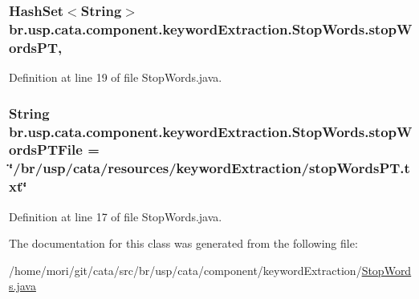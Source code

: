 \hypertarget{classbr_1_1usp_1_1cata_1_1component_1_1keyword_extraction_1_1_stop_words_af7f20647ee5e5a87e9a853aeb3fd082c}{
\subsubsection[{stop\+Words\+P\+T}]{\setlength{\rightskip}{0pt plus 5cm}Hash\+Set$<$String$>$ br.\+usp.\+cata.\+component.\+keyword\+Extraction.\+Stop\+Words.\+stop\+Words\+P\+T\hspace{0.3cm}{\ttfamily [static]}, {\ttfamily [private]}}}\label{classbr_1_1usp_1_1cata_1_1component_1_1keyword_extraction_1_1_stop_words_af7f20647ee5e5a87e9a853aeb3fd082c}


Definition at line 19 of file Stop\+Words.\+java.

\hypertarget{classbr_1_1usp_1_1cata_1_1component_1_1keyword_extraction_1_1_stop_words_a510f6cbec0ff0da13defd502448ffc21}{
\subsubsection[{stop\+Words\+P\+T\+File}]{\setlength{\rightskip}{0pt plus 5cm}String br.\+usp.\+cata.\+component.\+keyword\+Extraction.\+Stop\+Words.\+stop\+Words\+P\+T\+File = \char`\"{}/br/usp/cata/resources/keyword\+Extraction/stop\+Words\+P\+T.\+txt\char`\"{}\hspace{0.3cm}{\ttfamily [private]}}}\label{classbr_1_1usp_1_1cata_1_1component_1_1keyword_extraction_1_1_stop_words_a510f6cbec0ff0da13defd502448ffc21}


Definition at line 17 of file Stop\+Words.\+java.



The documentation for this class was generated from the following file\+:\begin{DoxyCompactItemize}
\item 
/home/mori/git/cata/src/br/usp/cata/component/keyword\+Extraction/\hyperlink{_stop_words_8java}{Stop\+Words.\+java}\end{DoxyCompactItemize}
